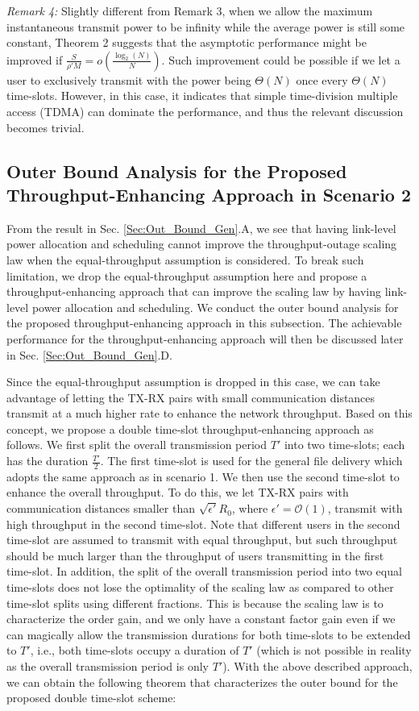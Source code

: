 \documentclass[journal,draftclsnofoot,onecolumn,12pt,twoside]{IEEEtran}
\begin{document}
{\em Remark 4:} Slightly different from Remark 3, when we allow the maximum instantaneous transmit power to be infinity while the average power is still some constant, Theorem 2 suggests that the asymptotic performance might be improved if $\frac{S}{\rho'M}=o\left(\frac{\log_2(N)}{N}\right)$. Such improvement could be possible if we let a user to exclusively transmit with the power being $\Theta(N)$ once every $\Theta(N)$ time-slots. However, in this case, it indicates that simple time-division multiple access (TDMA) can dominate the performance, and thus the relevant discussion becomes trivial.


\subsection{Outer Bound Analysis for the Proposed Throughput-Enhancing Approach in Scenario 2} 

From the result in Sec. \ref{Sec:Out_Bound_Gen}.A, we see that having link-level power allocation and scheduling cannot improve the throughput-outage scaling law when the equal-throughput assumption is considered. To break such limitation, we drop the equal-throughput assumption here and propose a throughput-enhancing approach that can improve the scaling law by having link-level power allocation and scheduling. We conduct the outer bound analysis for the proposed throughput-enhancing approach in this subsection. The achievable performance for the throughput-enhancing approach will then be discussed later in Sec. \ref{Sec:Out_Bound_Gen}.D.

Since the equal-throughput assumption is dropped in this case, we can take advantage of letting the TX-RX pairs with small communication distances transmit at a much higher rate to enhance the network throughput. {Based on this concept, we propose a double time-slot throughput-enhancing approach as follows.} We first split the overall transmission period $T'$ into two time-slots; each has the duration $\frac{T'}{2}$. The first time-slot is used for the general file delivery which adopts the same approach as in scenario 1. We then use the second time-slot to enhance the overall throughput. To do this, we let TX-RX pairs with communication distances smaller than $\sqrt{\epsilon'}R_0$, where $\epsilon'=\mathcal{O}(1)$, transmit with high throughput in the second time-slot. Note that different users in the second time-slot are assumed to transmit with equal throughput, but such throughput should be much larger than the throughput of users transmitting in the first time-slot. In addition, the split of the overall transmission period into two equal time-slots does not lose the optimality of the scaling law as compared to other time-slot splits using different fractions. This is because the scaling law is to characterize the order gain, and we only have a constant factor gain even if we can magically allow the transmission durations for both time-slots to be extended to $T'$, i.e., both time-slots occupy a duration of $T'$ (which is not possible in reality as the overall transmission period is only $T'$). With the above described approach, we can obtain the following theorem that characterizes the outer bound for the proposed double time-slot scheme:
\end{document}

